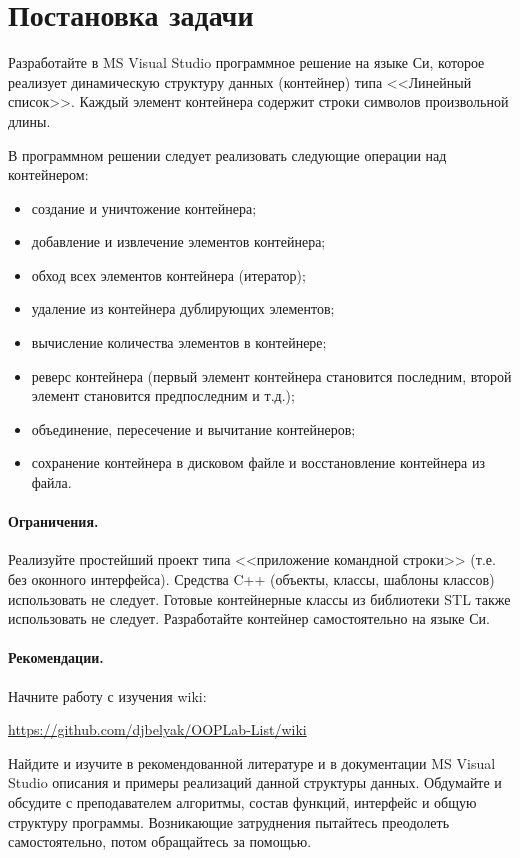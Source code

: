 ﻿\section{Постановка задачи}

Разработайте в MS Visual Studio программное решение на языке Си, которое реализует динамическую структуру данных (контейнер) типа <<Линейный список>>. 
Каждый элемент контейнера содержит строки символов произвольной длины. 

В программном решении следует реализовать следующие операции над контейнером: 
\begin{itemize}
\item создание и уничтожение контейнера; 
\item  добавление и извлечение элементов контейнера; 
\item  обход всех элементов контейнера (итератор); 
\item удаление из контейнера дублирующих элементов; 
\item  вычисление количества элементов в контейнере; 
\item  реверс контейнера (первый элемент контейнера становится последним, второй элемент становится предпоследним и т.д.); 
\item  объединение, пересечение и вычитание контейнеров; 
\item  сохранение контейнера в дисковом файле и восстановление контейнера из файла. 
\end{itemize}

\paragraph{Ограничения.}

Реализуйте простейший проект типа <<приложение командной строки>> (т.е. без оконного интерфейса). 
Средства C++ (объекты, классы, шаблоны классов) использовать не следует. 
Готовые контейнерные классы из библиотеки STL также использовать не следует. Разработайте контейнер самостоятельно на языке Си. 

\paragraph{Рекомендации.}
 Начните работу с изучения wiki:

 \href{https://github.com/djbelyak/OOPLab-List/wiki}{https://github.com/djbelyak/OOPLab-List/wiki}

Найдите и изучите в рекомендованной литературе и в документации MS Visual Studio описания и примеры реализаций данной структуры данных. 
Обдумайте и обсудите с преподавателем алгоритмы, состав функций, интерфейс и общую структуру программы. 
Возникающие затруднения пытайтесь преодолеть самостоятельно, потом обращайтесь за помощью. 

